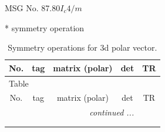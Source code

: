 \documentclass[fleqn,8pt]{jsarticle}
\begin{document}
\setcounter{MaxMatrixCols}{32}

\renewcommand{\tablename}{Table~}
\renewcommand{\figurename}{Figure~}
\begin{center}
\LARGE
MSG No. 87.80\quad$I_{c}4/m$
\end{center}
* symmetry operation
\renewcommand{\arraystretch}{1.3}
\begin{longtable}{ccccc}
\caption{Symmetry operations for 3d polar vector.}
 \\
 \hline \hline
No. & tag & matrix (polar) & det & TR \\ \hline \endfirsthead

\multicolumn{4}{l}{\tablename\ \thetable{}} \\
 \hline \hline
No. & tag & matrix (polar) & det & TR \\ \hline \endhead

 \hline \hline
\multicolumn{4}{r}{\footnotesize\it continued ...} \\ \endfoot

 \hline \hline
\multicolumn{4}{r}{} \\ \endlastfoot


\end{longtable}
\end{document}
